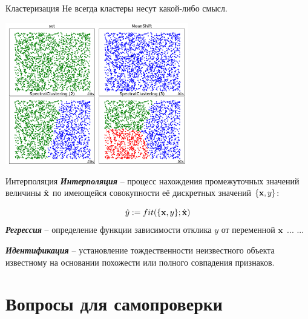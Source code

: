 \documentclass{beamer}
\newcommand{\termdef}[1]{\textbf{\textit{#1}}}
\begin{document}
   \begin{frame}{Кластеризация}
   Не всегда кластеры несут какой-либо смысл.
	\begin{center}
		\includegraphics[width=8cm]{../pic/clustering_example_3.png}
	\end{center}
	\end{frame}

	\begin{frame}{Интерполяция}
	\termdef{Интерполяция} -- процесс нахождения промежуточных значений величины 
	$\hat {\bold x}$ 	
	по имеющейся совокупности её дискретных значений 
	$\{ \bold x, y\}$:
	
	\begin{equation}
	\hat y := fit(\{ \bold x, y\}; \hat {\bold x})
	\end{equation}
	\termdef{Регрессия} -- определение функции зависимости отклика $y$ от переменной $\bold x$ ... ... 
	\end{frame}
   
   \begin{frame}
   \termdef{Идентификация} -- установление тождественности неизвестного объекта известному на основании похожести или полного совпадения признаков.
   
   \end{frame}
   
   \section{Вопросы для самопроверки}
\end{document}
